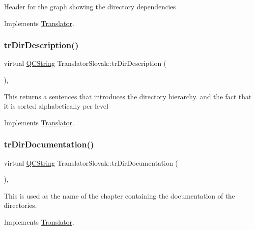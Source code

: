 Header for the graph showing the directory dependencies 

Implements \mbox{\hyperlink{class_translator}{Translator}}.

\mbox{\label{class_translator_slovak_abb965515b35c338259e5d1497e6f1381}} 
\subsubsection{\texorpdfstring{trDirDescription()}{trDirDescription()}}
{\footnotesize\ttfamily virtual \mbox{\hyperlink{class_q_c_string}{Q\+C\+String}} Translator\+Slovak\+::tr\+Dir\+Description (\begin{DoxyParamCaption}{ }\end{DoxyParamCaption})\hspace{0.3cm}{\ttfamily [inline]}, {\ttfamily [virtual]}}

This returns a sentences that introduces the directory hierarchy. and the fact that it is sorted alphabetically per level 

Implements \mbox{\hyperlink{class_translator}{Translator}}.

\mbox{\label{class_translator_slovak_af30722d322dc5dd83518a2c7dcb6b811}} 
\subsubsection{\texorpdfstring{trDirDocumentation()}{trDirDocumentation()}}
{\footnotesize\ttfamily virtual \mbox{\hyperlink{class_q_c_string}{Q\+C\+String}} Translator\+Slovak\+::tr\+Dir\+Documentation (\begin{DoxyParamCaption}{ }\end{DoxyParamCaption})\hspace{0.3cm}{\ttfamily [inline]}, {\ttfamily [virtual]}}

This is used as the name of the chapter containing the documentation of the directories. 

Implements \mbox{\hyperlink{class_translator}{Translator}}.

\mbox{\label{class_translator_slovak_a38737597f39706de16e05ba07d1d07de}} 

